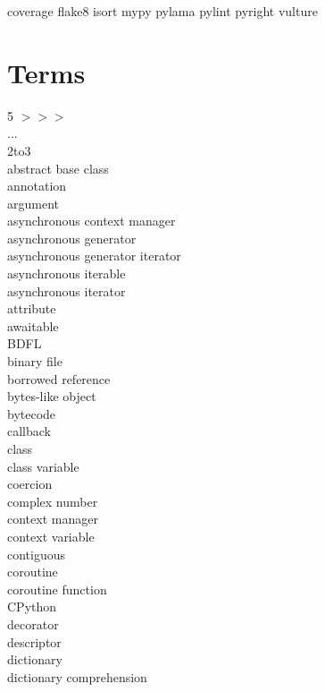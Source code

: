 \documentclass [8pt] {extarticle}
\begin{document}
    coverage \quad
    flake8 \quad
    isort \quad
    mypy \quad
    pylama \quad
    pylint \quad
    pyright \quad
    vulture \quad

    \pagebreak

    \section {Terms}

    \begin {multicols} {5}
        $ >>> $ \\
        ... \\
        2to3 \\
        abstract base class \\
        annotation \\
        argument \\
        asynchronous context manager \\
        asynchronous generator \\
        asynchronous generator iterator \\
        asynchronous iterable \\
        asynchronous iterator \\
        attribute \\
        awaitable \\
        BDFL \\
        binary file \\
        borrowed reference \\
        bytes-like object \\
        bytecode \\
        callback \\
        class \\
        class variable \\
        coercion \\
        complex number \\
        context manager \\
        context variable \\
        contiguous \\
        coroutine \\
        coroutine function \\
        CPython \\
        decorator \\
        descriptor \\
        dictionary \\
        dictionary comprehension \\

\end{multicols}
\end{document}
